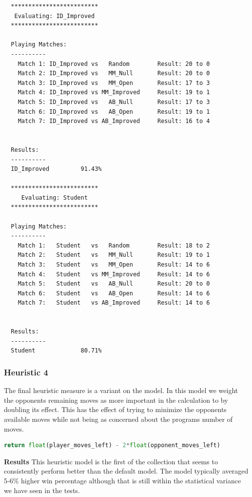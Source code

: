 \documentclass{article}
\begin{document}
\begin{verbatim}
  *************************
   Evaluating: ID_Improved
  *************************

  Playing Matches:
  ----------
    Match 1: ID_Improved vs   Random    	Result: 20 to 0
    Match 2: ID_Improved vs   MM_Null   	Result: 20 to 0
    Match 3: ID_Improved vs   MM_Open   	Result: 17 to 3
    Match 4: ID_Improved vs MM_Improved 	Result: 19 to 1
    Match 5: ID_Improved vs   AB_Null   	Result: 17 to 3
    Match 6: ID_Improved vs   AB_Open   	Result: 19 to 1
    Match 7: ID_Improved vs AB_Improved 	Result: 16 to 4


  Results:
  ----------
  ID_Improved         91.43%

  *************************
     Evaluating: Student
  *************************

  Playing Matches:
  ----------
    Match 1:   Student   vs   Random    	Result: 18 to 2
    Match 2:   Student   vs   MM_Null   	Result: 19 to 1
    Match 3:   Student   vs   MM_Open   	Result: 14 to 6
    Match 4:   Student   vs MM_Improved 	Result: 14 to 6
    Match 5:   Student   vs   AB_Null   	Result: 20 to 0
    Match 6:   Student   vs   AB_Open   	Result: 14 to 6
    Match 7:   Student   vs AB_Improved 	Result: 14 to 6


  Results:
  ----------
  Student             80.71%
\end{verbatim}

\subsubsection{Heuristic 4}

The final heuristic measure is a variant on the \texttt{} model. In this model we weight the opponents
remaining moves as more important in the calculation to by doubling its effect. This has the effect of trying to minimize
the opponents available moves while not being as concerned about the programs number of moves. \newline

\begin{lstlisting}[language = python]
  return float(player_moves_left) - 2*float(opponent_moves_left)
\end{lstlisting}
\newline
\textbf{Results}\newline
This heuristic model is the first of the collection that seems to consistently perform better than the default \texttt{} model.
The model typically averaged 5-6\% higher win percentage although that is still within the statistical variance we have seen in the tests.
\end{document}
